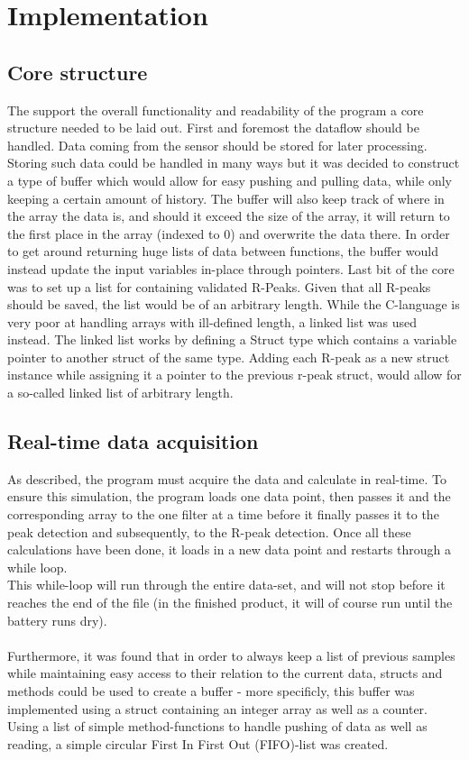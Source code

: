 \documentclass[12pt,a4paper]{article}
\begin{document}
\section{Implementation}
\subsection{Core structure}
The support the overall functionality and readability of the program a core structure needed to be laid out. First and foremost the dataflow should be handled. Data coming from the sensor should be stored for later processing. Storing such data could be handled in many ways but it was decided to construct a type of buffer which would allow for easy pushing and pulling data, while only keeping a certain amount of history.
The buffer will also keep track of where in the array the data is, and should it exceed the size of the array, it will return to the first place in the array (indexed to 0) and overwrite the data there.
In order to get around returning huge lists of data between functions, the buffer would instead update the input variables in-place through pointers.
Last bit of the core was to set up a list for containing validated R-Peaks. Given that all R-peaks should be saved, the list would be of an arbitrary length. While the C-language is very poor at handling arrays with ill-defined length, a linked list was used instead. The linked list works by defining a Struct type which contains a variable pointer to another struct of the same type. Adding each R-peak as a new struct instance while assigning it a pointer to the previous r-peak struct, would allow for a so-called linked list of arbitrary length.

\subsection{Real-time data acquisition}
	As described, the program must acquire the data and calculate in real-time. To ensure this simulation, the program loads one data point, then passes it and the corresponding array to the one filter at a time before it finally passes it to the peak detection and subsequently, to the R-peak detection. Once all these calculations have been done, it loads in a new data point and restarts through a while loop.\\
	This while-loop will run through the entire data-set, and will not stop before it reaches the end of the file (in the finished product, it will of course run until the battery runs dry).\\
	\\
	Furthermore, it was found that in order to always keep a list of previous samples while maintaining easy access to their relation to the current data, structs and methods could be used to create a buffer - more specificly, this buffer was implemented using a struct containing an integer array as well as a counter. Using a list of simple method-functions to handle pushing of data as well as reading, a simple circular First In First Out (FIFO)-list was created.
	
\end{document}
